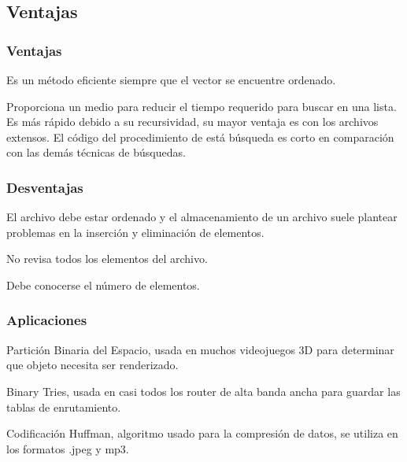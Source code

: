 \documentclass{beamer}
\begin{document}
\subsection{Ventajas} %

		\begin{frame}
			\frametitle{Ventajas}
				\begin{center}
				Es un método eficiente siempre que el vector se encuentre ordenado.

                Proporciona un medio para reducir el tiempo requerido para buscar en una lista.
                Es más rápido debido a su recursividad, su mayor ventaja es con los archivos extensos.
                El código del procedimiento de está búsqueda es corto en comparación con las demás técnicas de búsquedas.

				\end{center}
		
		\end{frame}

		\begin{frame}
			\frametitle{Desventajas}
				
			\begin{center}
			El archivo debe estar ordenado y el almacenamiento de un archivo suele plantear problemas en la inserción y eliminación de elementos.

			No revisa todos los elementos del archivo.
			
			Debe conocerse el número de elementos. 

			\end{center}
		\end{frame}


\begin{frame}
			\frametitle{Aplicaciones}
				
			\begin{center}
			Partición Binaria del Espacio, usada en muchos videojuegos 3D para determinar que objeto necesita ser renderizado.

			Binary Tries, usada en casi todos los router de alta banda ancha para guardar las tablas de enrutamiento.

			
			Codificación Huffman, algoritmo usado para la compresión de datos, se utiliza en los formatos .jpeg y mp3. 

			\end{center}
		\end{frame}
\end{document}
